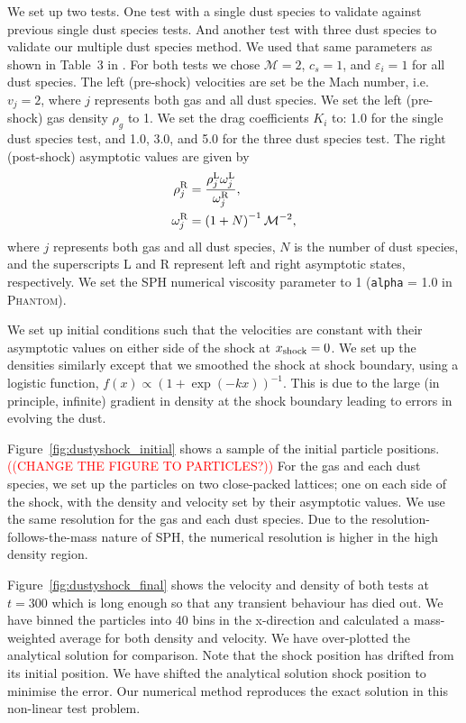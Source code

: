 \documentclass[fleqn,usenatbib]{mnras}
\begin{document}
We set up two tests. One test with a single dust species to validate against
previous single dust species tests. And another test with three dust species to
validate our multiple dust species method. We used that same parameters as shown
in Table~3 in \citet{Benitez-Llambay2019ApJS..241...25B}. For both tests we
chose \(\mathcal{M} = 2\), \(c_s = 1\), and \(\varepsilon_i = 1\) for all dust
species. The left (pre-shock) velocities are set be the Mach number, i.e. \(v_j=
2\), where \(j\) represents both gas and all dust species. We set the left
(pre-shock) gas density \(\rho_g\) to 1. We set the drag coefficients \(K_i\)
to: 1.0 for the single dust species test, and 1.0, 3.0, and 5.0 for the three
dust species test. The right (post-shock) asymptotic values are given by
%
\begin{align}
   \rho_{j}^{\rm R} &=
      \frac{\rho_{j}^{\rm L} \omega_{j}^{\rm L}} {\omega_{j}^{\rm R}}, \\
   \omega_j^{\rm R} &= \left(1 + N \right)^{-1} \mathcal{M}^{-2},
\end{align}
%
where \(j\) represents both gas and all dust species, \(N\) is the number of
dust species, and the superscripts L and R represent left and right asymptotic
states, respectively. We set the SPH numerical viscosity parameter to 1
(\texttt{alpha} = 1.0 in \textsc{Phantom}).

We set up initial conditions such that the velocities are constant with their
asymptotic values on either side of the shock at \(x_{\rm shock} = 0\). We set
up the densities similarly except that we smoothed the shock at shock boundary,
using a logistic function, \(f(x) \propto {(1 + \exp(-kx))}^{-1}\). This is due
to the large (in principle, infinite) gradient in density at the shock boundary
leading to errors in evolving the dust.

Figure~\ref{fig:dustyshock_initial} shows a sample of the initial particle
positions. \textcolor{red}{((CHANGE THE FIGURE TO PARTICLES?))} For the gas and
each dust species, we set up the particles on two close-packed lattices; one on
each side of the shock, with the density and velocity set by their asymptotic
values. We use the same resolution for the gas and each dust species. Due to the
resolution-follows-the-mass nature of SPH, the numerical resolution is higher in
the high density region.

Figure~\ref{fig:dustyshock_final} shows the velocity and density of both tests
at \(t = 300\) which is long enough so that any transient behaviour has died
out. We have binned the particles into 40 bins in the x-direction and calculated
a mass-weighted average for both density and velocity. We have over-plotted the
analytical solution for comparison. Note that the shock position has drifted
from its initial position. We have shifted the analytical solution shock
position to minimise the error. Our numerical method reproduces the exact
solution in this non-linear test problem.
\end{document}
